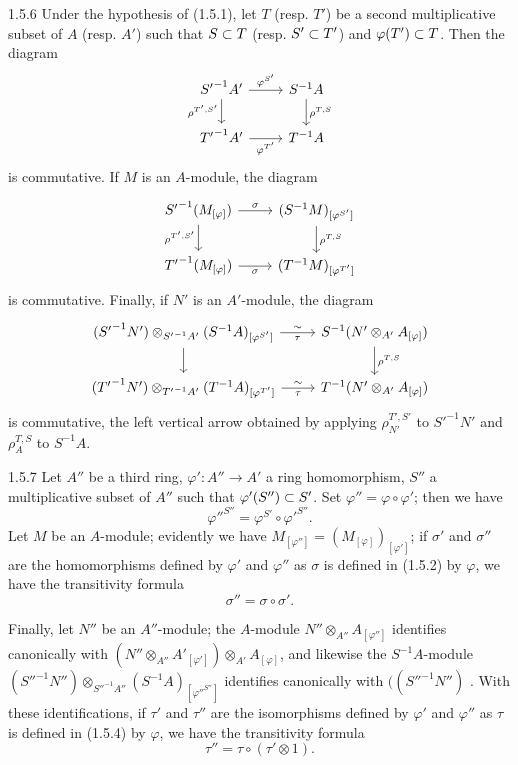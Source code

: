 \documentclass[../main.tex]{subfiles}
\begin{document}
\begin{cx}{1.5.6}
Under the hypothesis of (1.5.1), let $T$ (resp. $T'$) be a second multiplicative subset of $A$
(resp. $A'$) such that $S\subset T$ (resp. $S'\subset T'$) and $\varphi(T')\subset T$. Then the diagram
\[\begin{tikzcd}
  {S'}^{-1}A'\ar[r,"\varphi^{S'}"]\ar[d,"\rho^{T',S'}"'] & S^{-1}A\ar[d,"\rho^{T,S}"]\\
  {T'}^{-1}A'\ar[r,"\varphi^{T'}"'] & T^{-1}A
\end{tikzcd}\]
is commutative. If $M$ is an $A$-module, the diagram
\[\begin{tikzcd}
  {S'}^{-1}(M_{[\varphi]})\ar[r,"\sigma"]\ar[d,"\rho^{T',S'}"'] &
  (S^{-1}M)_{[\varphi^{S'}]}\ar[d,"\rho^{T,S}"]\\
  {T'}^{-1}(M_{[\varphi]})\ar[r,"\sigma"'] & (T^{-1}M)_{[\varphi^{T'}]}
\end{tikzcd}\]
is commutative. Finally, if $N'$ is an $A'$-module, the diagram
\[\begin{tikzcd}
  ({S'}^{-1}N')\otimes_{{S'}^{-1}A'}(S^{-1}A)_{[\varphi^{S'}]}
  \ar[r,"\sim","\tau"'] \ar[d] &
  S^{-1}(N'\otimes_{A'}A_{[\varphi]})\ar[d,"\rho^{T,S}"]\\
  ({T'}^{-1}N')\otimes_{{T'}^{-1}A'}(T^{-1}A)_{[\varphi^{T'}]}
  \ar[r,"\sim","\tau"'] & T^{-1}(N'\otimes_{A'}A_{[\varphi]})
\end{tikzcd}\]
is commutative, the left vertical arrow obtained by applying
$\rho_{N'}^{T',S'}$ to ${S'}^{-1}N'$ and $\rho_A^{T,S}$ to $S^{-1}A$.
\end{cx}

\begin{cx}{1.5.7}
Let $A''$ be a third ring, $\varphi':A''\to A'$ a ring homomorphism,
$S''$ a multiplicative subset of $A''$ such that $\varphi'(S'')\subset S'$. Set
$\varphi''=\varphi\circ\varphi'$; then we have
\[
  {\varphi''}^{S''}=\varphi^{S'}\circ{\varphi'}^{S''}.
\]
Let $M$ be an $A$-module; evidently we have $M_{[\varphi'']}=(M_{[\varphi]})_{[\varphi']}$;
if $\sigma'$ and $\sigma''$ are the homomorphisms defined by $\varphi'$ and $\varphi''$ as
$\sigma$ is defined in (1.5.2) by $\varphi$, we have the transitivity formula
\[
  \sigma''=\sigma\circ\sigma'.
\]

Finally, let $N''$ be an $A''$-module; the $A$-module $N''\otimes_{A''}A_{[\varphi'']}$
identifies canonically with
$(N''\otimes_{A''}{A'}_{[\varphi']})\otimes_{A'}A_{[\varphi]}$,
and likewise the $S^{-1}A$-module
${({S''}^{-1}N'')\otimes_{{S''}^{-1}A''}(S^{-1}A)_{[{\varphi''}^{S''}]}}$ identifies
canonically with
$(({S''}^{-1}N'')$ . With these identifications, if $\tau'$
and $\tau''$ are the isomorphisms defined by $\varphi'$ and $\varphi''$ as $\tau$ is defined
in (1.5.4) by $\varphi$, we have the transitivity formula
\[
  \tau''=\tau\circ(\tau'\otimes 1).
\]
\end{cx}
\end{document}

